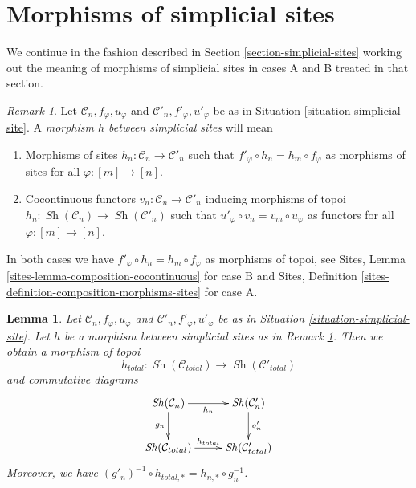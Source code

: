 \documentclass{stacks-project}
\theoremstyle{plain}
\newtheorem{lemma}[subsection]{Lemma}
\theoremstyle{definition}
\theoremstyle{remark}
\newtheorem{remark}[subsection]{Remark}
\numberwithin{equation}{subsection}
\def\Sh{\mathop{\mathit{Sh}}\nolimits}
\begin{document}
\section{Morphisms of simplicial sites}
\label{section-morphism-simplicial-sites}

\noindent
We continue in the fashion described in
Section \ref{section-simplicial-sites}
working out the meaning of morphisms of simplicial sites
in cases A and B treated in that section.

\begin{remark}
\label{remark-morphism-simplicial-sites}
Let $\mathcal{C}_n, f_\varphi, u_\varphi$ and
$\mathcal{C}'_n, f'_\varphi, u'_\varphi$ be as in
Situation \ref{situation-simplicial-site}. A
{\it morphism $h$ between simplicial sites} will mean
\begin{enumerate}
\item[(A)] Morphisms of sites
$h_n : \mathcal{C}_n \to \mathcal{C}'_n$
such that $f'_\varphi \circ h_n = h_m \circ f_\varphi$
as morphisms of sites for all $\varphi : [m] \to [n]$.
\item[(B)] Cocontinuous functors
$v_n : \mathcal{C}_n \to \mathcal{C}'_n$
inducing morphisms of topoi $h_n : \Sh(\mathcal{C}_n) \to \Sh(\mathcal{C}'_n)$
such that $u'_\varphi \circ v_n = v_m \circ u_\varphi$
as functors for all $\varphi : [m] \to [n]$.
\end{enumerate}
In both cases we have
$f'_\varphi \circ h_n = h_m \circ f_\varphi$
as morphisms of topoi, see
Sites, Lemma \ref{sites-lemma-composition-cocontinuous}
for case B and Sites,
Definition \ref{sites-definition-composition-morphisms-sites}
for case A.
\end{remark}

\begin{lemma}
\label{lemma-morphism-simplicial-sites}
Let $\mathcal{C}_n, f_\varphi, u_\varphi$ and
$\mathcal{C}'_n, f'_\varphi, u'_\varphi$ be as in
Situation \ref{situation-simplicial-site}.
Let $h$ be a morphism between simplicial sites as in
Remark \ref{remark-morphism-simplicial-sites}.
Then we obtain a morphism of topoi
$$
h_{total} : \Sh(\mathcal{C}_{total}) \to \Sh(\mathcal{C}'_{total})
$$
and commutative diagrams
$$
\xymatrix{
\Sh(\mathcal{C}_n) \ar[d]_{g_n} \ar[r]_{h_n} &
\Sh(\mathcal{C}'_n) \ar[d]^{g'_n} \\
\Sh(\mathcal{C}_{total}) \ar[r]^{h_{total}} &
\Sh(\mathcal{C}'_{total})
}
$$
Moreover, we have $(g'_n)^{-1} \circ h_{total, *} = h_{n, *} \circ g_n^{-1}$.
\end{lemma}
\end{document}
